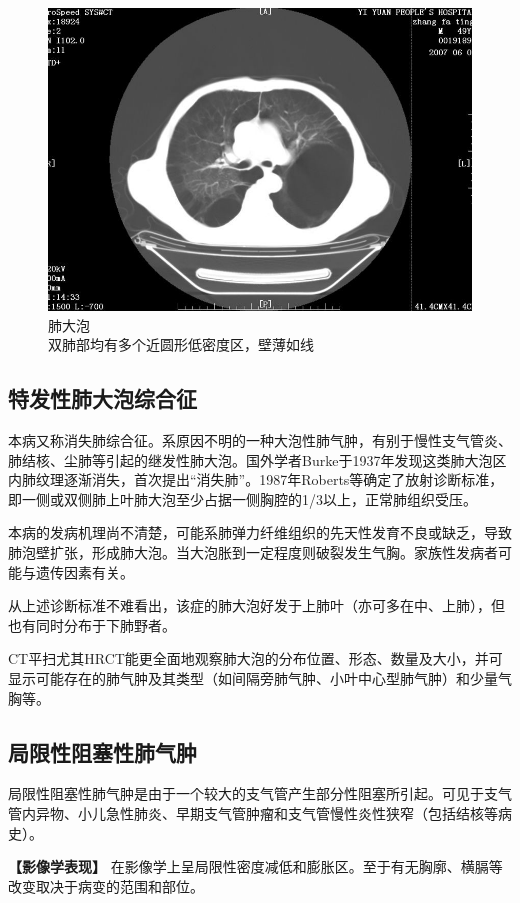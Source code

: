 \begin{figure}[!htbp]
 \centering
 \includegraphics[width=.7\textwidth,height=\textheight,keepaspectratio]{./images/Image00196.jpg}
 \captionsetup{justification=centering}
 \caption{肺大泡\\{\small 双肺部均有多个近圆形低密度区，壁薄如线}}
 \label{fig9-12}
  \end{figure} 

\subsection{特发性肺大泡综合征}

本病又称消失肺综合征。系原因不明的一种大泡性肺气肿，有别于慢性支气管炎、肺结核、尘肺等引起的继发性肺大泡。国外学者Burke于1937年发现这类肺大泡区内肺纹理逐渐消失，首次提出“消失肺”。1987年Roberts等确定了放射诊断标准，即一侧或双侧肺上叶肺大泡至少占据一侧胸腔的1/3以上，正常肺组织受压。

本病的发病机理尚不清楚，可能系肺弹力纤维组织的先天性发育不良或缺乏，导致肺泡壁扩张，形成肺大泡。当大泡胀到一定程度则破裂发生气胸。家族性发病者可能与遗传因素有关。

从上述诊断标准不难看出，该症的肺大泡好发于上肺叶（亦可多在中、上肺），但也有同时分布于下肺野者。

CT平扫尤其HRCT能更全面地观察肺大泡的分布位置、形态、数量及大小，并可显示可能存在的肺气肿及其类型（如间隔旁肺气肿、小叶中心型肺气肿）和少量气胸等。

\subsection{局限性阻塞性肺气肿}

局限性阻塞性肺气肿是由于一个较大的支气管产生部分性阻塞所引起。可见于支气管内异物、小儿急性肺炎、早期支气管肿瘤和支气管慢性炎性狭窄（包括结核等病史）。

\textbf{【影像学表现】}
在影像学上呈局限性密度减低和膨胀区。至于有无胸廓、横膈等改变取决于病变的范围和部位。


